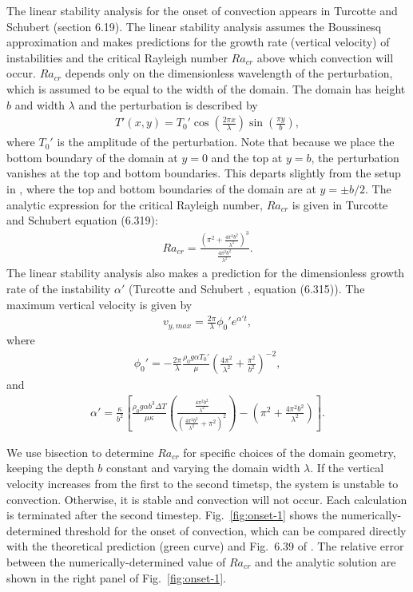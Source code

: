\documentclass{article}
\begin{document}
The linear stability analysis for the onset of convection appears in Turcotte and Schubert \cite{TS14} (section 6.19). The linear stability analysis assumes the Boussinesq approximation and makes predictions for the growth rate (vertical velocity) of instabilities and the critical Rayleigh number $Ra_{cr}$ above which convection will occur. $Ra_{cr}$ depends only on the dimensionless wavelength of the perturbation, which is assumed to be equal to the width of the domain. The domain has height $b$ and width $\lambda$ and the perturbation is described by
\begin{align*}
T'(x,y) = T_0'\cos\left(\frac{2\pi x}{\lambda}\right)\sin\left(\frac{\pi y}{b} \right),
\end{align*}
where $T_0'$ is the amplitude of the perturbation. Note that because we place the bottom boundary of the domain at $y=0$ and the top at $y=b$, the perturbation vanishes at the top and bottom boundaries. This departs slightly from the setup in \cite{TS14}, where the top and bottom boundaries of the domain are at $y=\pm b/2$. The analytic expression for the critical Rayleigh number, $Ra_{cr}$ is given in Turcotte and Schubert \cite{TS14} equation (6.319):
\begin{align*}
Ra_{cr}=\frac{\left(\pi^2+\frac{4\pi^2 b^2}{\lambda^2}\right)^3}{\frac{4\pi^2 b^2}{\lambda^2}}.
\end{align*}
The linear stability analysis also makes a prediction for the dimensionless growth rate of the instability $\alpha'$ (Turcotte and Schubert \cite{TS14}, equation (6.315)). The maximum vertical velocity is given by
\begin{align*}
v_{y,max} = \frac{2\pi}{\lambda}\phi_0' e^{\alpha' t},
\end{align*}
where
\begin{align*}
\phi_0' = -\frac{2\pi}{\lambda}\frac{\rho_0 g \alpha T_0'}{\mu}\left(\frac{4\pi^2}{\lambda^2}+\frac{\pi^2}{b^2} \right)^{-2},
\end{align*}
and
\begin{align*}
\alpha'=\frac{\kappa}{b^2}\left[\frac{\rho_0 g \alpha b^3 \Delta T}{\mu \kappa}\left(\frac{\frac{4\pi^2 b^2}{\lambda^2}}{\left(\frac{4\pi^2 b^2}{\lambda^2}+\pi^2\right)^2}\right) -\left(\pi^2+\frac{4\pi^2b^2}{\lambda^2}\right)\right].
\end{align*}

We use bisection to determine $Ra_{cr}$ for specific choices of the domain geometry, keeping the depth $b$ constant and varying the domain width $\lambda$. If the vertical velocity increases from the first to the second timetsp, the system is unstable to convection. Otherwise, it is stable and convection will not occur. Each calculation is terminated after the second timestep. Fig.~\ref{fig:onset-1} shows the numerically-determined threshold for the onset of convection, which can be compared directly with the theoretical prediction (green curve) and Fig.~6.39 of \cite{TS14}. The relative error between the numerically-determined value of $Ra_{cr}$ and the analytic solution are shown in the right panel of Fig.~\ref{fig:onset-1}.
\end{document}
